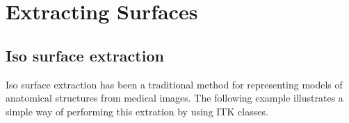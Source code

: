 \ifitkFullVersion

\fi


\ifitkFullVersion

\fi



\section{Extracting Surfaces}
\label{sec:ExtractingSurfaces}

\subsection{Iso surface extraction}

Iso surface extraction has been a traditional method for representing models of
anatomical structures from medical images. The following example illustrates a
simple way of performing this extration by using ITK classes.


\ifitkFullVersion

\fi





